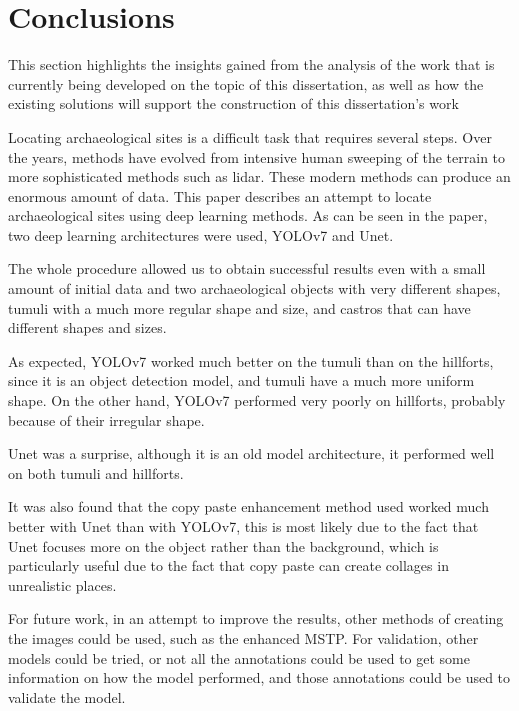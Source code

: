 \chapter{Conclusions}
\label{chapter:conclusion}

\begin{introduction}
This section highlights the insights gained from the analysis of the work that is currently being developed on the topic of this dissertation, as well as how the existing solutions will support the construction of this dissertation's work
\end{introduction}


Locating archaeological sites is a difficult task that requires several steps. Over the years, methods have evolved from intensive human sweeping of the terrain to more sophisticated methods such as lidar. These modern methods can produce an enormous amount of data. This paper describes an attempt to locate archaeological sites using deep learning methods. As can be seen in the paper, two deep learning architectures were used, YOLOv7 and Unet. 

The whole procedure allowed us to obtain successful results even with a small amount of initial data and two archaeological objects with very different shapes, tumuli with a much more regular shape and size, and castros that can have different shapes and sizes.


As expected, YOLOv7 worked much better on the tumuli than on the hillforts, since it is an object detection model, and tumuli have a much more uniform shape. On the other hand, YOLOv7 performed very poorly on hillforts, probably because of their irregular shape. 

Unet was a surprise, although it is an old model architecture, it performed well on both tumuli and hillforts.

It was also found that the copy paste enhancement method used worked much better with Unet than with YOLOv7, this is most likely due to the fact that Unet focuses more on the object rather than the background, which is particularly useful due to the fact that copy paste can create collages in unrealistic places.

For future work, in an attempt to improve the results, other methods of creating the images could be used, such as the enhanced MSTP. For validation, other models could be tried, or not all the annotations could be used to get some information on how the model performed, and those annotations could be used to validate the model.

